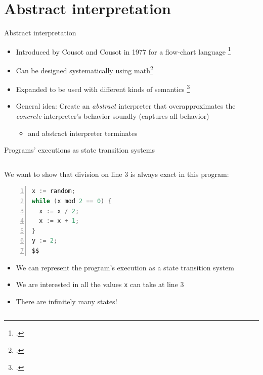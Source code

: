 \documentclass[aspectratio=169]{beamer}
\begin{document}

\section{Abstract interpretation}

\begin{frame}{Abstract interpretation}
  \begin{itemize}[<+->]
  \item Introduced by Cousot and Cousot in 1977 for a flow-chart language \footcite{cousot1977abstract}
  \item Can be designed systematically using math\footcite{cousot1979systematic}
  \item Expanded to be used with different kinds of semantics \footcite{schmidt1998trace,schmidt2009abstract,van2010abstracting,van2012systematic}
  \item General idea: Create an \emph{abstract} interpreter that
    overapproximates the \emph{concrete} interpreter's behavior
    soundly (captures all behavior)
    \begin{itemize}
    \item and abstract interpreter terminates 
    \end{itemize}

  \end{itemize}
\end{frame}

\begin{frame}[fragile]{Programs' executions as state transition systems}
  \footnotesize
  \begin{columns}[T]
    \begin{column}{0.45\textwidth}
      We want to show that division on line 3 is always exact in this program:

      \begin{lstlisting}[language=Java,numbers=left,mathescape,basicstyle={\footnotesize\ttfamily}]
x := random;
while (x mod 2 == 0) {
  x := x / 2;
  x := x + 1;
}
y := 2;
$$
\end{lstlisting}
\begin{itemize}
\item<2-> We can represent the program's execution as a state transition system
\item<10-> We are interested in all the values \texttt{x} can take at line 3
\item<11-> There are infinitely many states!
\end{itemize}
    \end{column}
    \begin{column}{0.5\textwidth}
    \end{column}

  \end{columns}
\end{frame}
\end{document}
